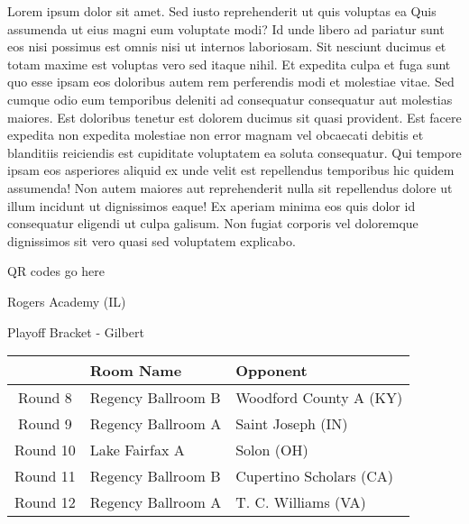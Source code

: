 \documentclass{article}%
\begin{document}
\vspace*{8pt}%
\linebreak%
\newline%
\newline%
Lorem ipsum dolor sit amet. Sed iusto reprehenderit ut quis voluptas ea Quis assumenda ut eius magni eum voluptate modi? Id unde libero ad pariatur sunt eos nisi possimus est omnis nisi ut internos laboriosam. Sit nesciunt ducimus et totam maxime est voluptas vero sed itaque nihil. Et expedita culpa et fuga sunt quo esse ipsam eos doloribus autem rem perferendis modi et molestiae vitae.\newline%
\newline%
Sed cumque odio eum temporibus deleniti ad consequatur consequatur aut molestias maiores. Est doloribus tenetur est dolorem ducimus sit quasi provident. Est facere expedita non expedita molestiae non error magnam vel obcaecati debitis et blanditiis reiciendis est cupiditate voluptatem ea soluta consequatur. Qui tempore ipsam eos asperiores aliquid ex unde velit est repellendus temporibus hic quidem assumenda!\newline%
\newline%
Non autem maiores aut reprehenderit nulla sit repellendus dolore ut illum incidunt ut dignissimos eaque! Ex aperiam minima eos quis dolor id consequatur eligendi ut culpa galisum. Non fugiat corporis vel doloremque dignissimos sit vero quasi sed voluptatem explicabo.\newline%
\newline%
%
\vspace*{30pt}%
\begin{center}%
\begin{Huge}%
QR codes go here%
\end{Huge}%
\end{center}%
\newpage%
\begin{center}%
\begin{Huge}%
Rogers Academy (IL)%
\end{Huge}%
\vspace*{8pt}%
\linebreak%
\begin{Large}%
Playoff Bracket {-} Gilbert%
\end{Large}%
\end{center}%
%
\begin{tabularx}{\textwidth}{|c|Y|Y|}%
\hline%
&Room Name&Opponent\\%
\hline%
Round 8&Regency Ballroom B&Woodford County A (KY)\\%
Round 9&Regency Ballroom A&Saint Joseph (IN)\\%
Round 10&Lake Fairfax A&Solon (OH)\\%
Round 11&Regency Ballroom B&Cupertino Scholars (CA)\\%
Round 12&Regency Ballroom A&T. C. Williams (VA)\\%
\hline%
\end{tabularx}%
\end{document}

